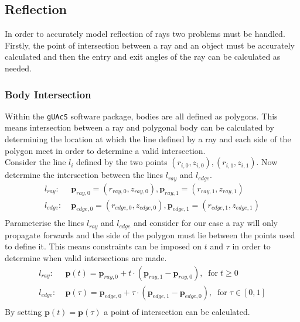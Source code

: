 \documentclass{article}
\begin{document}
\subsection{Reflection}
In order to accurately model reflection of rays two problems must be handled. Firstly, the point of intersection between a ray and an object must be accurately calculated and then the entry and exit angles of the ray can be calculated as needed.  

\subsubsection{Body Intersection}
Within the \texttt{gUAcS} software package, bodies are all defined as polygons. This means intersection between a ray and polygonal body can be calculated by determining the location at which the line defined by a ray and each side of the polygon meet in order to determine a valid intersection.
\\
Consider the line $l_i$ defined by the two points $(r_{i, 0}, z_{i, 0}), (r_{i, 1}, z_{i, 1})$. Now determine the intersection between the lines $l_{ray}$ and $l_{edge}$.
\begin{align*}
  l_{ray}:&\; \bm{p}_{ray, 0}=(r_{ray, 0}, z_{ray, 0}), \bm{p}_{ray, 1}=(r_{ray, 1}, z_{ray, 1}) \\
  l_{edge}:&\; \bm{p}_{edge, 0}=(r_{edge, 0}, z_{edge, 0}), \bm{p}_{edge, 1}=(r_{edge, 1}, z_{edge, 1}) \\
\end{align*}
Parameterise the lines $l_{ray}$ and $l_{edge}$ and consider for our case a ray will only propagate forwards and the side of the polygon must lie between the points used to define it. This means constraints can be imposed on $t$ and $\tau$ in order to determine when valid intersections are made. 
\begin{align*}
  l_{ray}:&\; \bm{p}(t)= \bm{p}_{ray, 0} + t\cdot(\bm{p}_{ray, 1} - \bm{p}_{ray, 0}),\;\;\mathrm{for}\;t\geq0\\
  l_{edge}:&\; \bm{p}(\tau)= \bm{p}_{edge, 0} + \tau\cdot(\bm{p}_{edge, 1} - \bm{p}_{edge, 0}),\;\;\mathrm{for}\;\tau\in[0, 1]\\
\end{align*}
By setting $\bm{p}(t)=\bm{p}(\tau)$ a point of intersection can be calculated.
\end{document}
